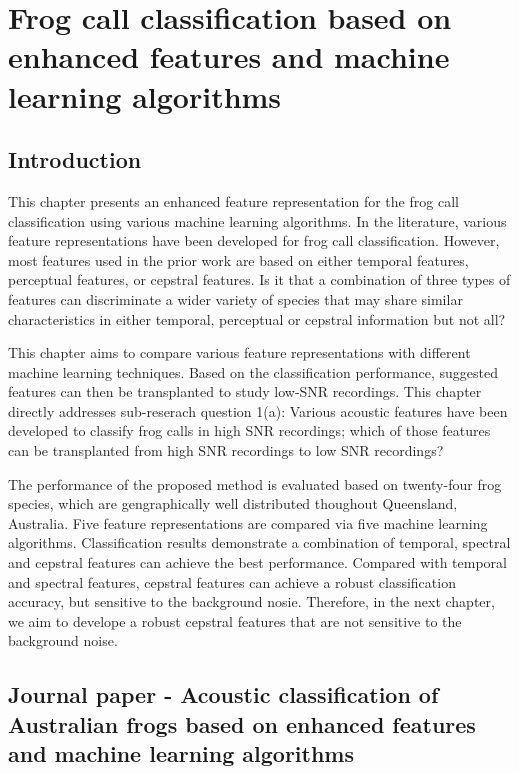 
\chapter[Frog call classification based on enhanced features]{Frog call classification based on enhanced features and machine learning algorithms}
\label{cha:cha4EnhancedFeature}



\section{Introduction}
\label{S:1}

This chapter presents an enhanced feature representation for the frog call classification using various machine learning algorithms. In the literature, various feature representations have been developed for frog call classification. However, most features used in the prior work are based on either temporal features, perceptual features, or cepstral features. Is it that a combination of three types of features can discriminate a wider variety of species that may share similar characteristics in either temporal, perceptual or cepstral information but not all?

This chapter aims to compare various feature representations with different machine learning techniques. Based on the classification performance, suggested features can then be transplanted to study low-SNR recordings. This chapter directly addresses sub-reserach question 1(a): Various acoustic features have been developed to classify frog calls in high SNR recordings; which of those features can be transplanted from high SNR recordings to low SNR recordings?

The performance of the proposed method is evaluated based on twenty-four frog species, which are gengraphically well distributed thoughout Queensland, Australia. Five feature representations are compared via five machine learning algorithms. Classification results demonstrate a combination of temporal, spectral and cepstral features can achieve the best performance. Compared with temporal and spectral features, cepstral features can achieve a robust classification accuracy, but sensitive to the background nosie. Therefore, in the next chapter, we aim to develope a robust cepstral features that are not sensitive to the background noise.




\section{Journal paper - Acoustic classification of Australian frogs based on enhanced features and machine learning algorithms}



